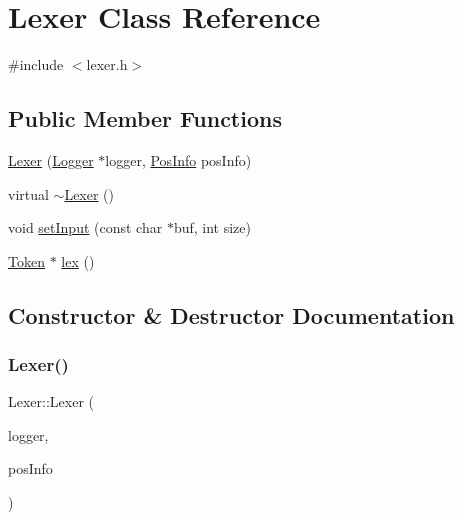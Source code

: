 \hypertarget{classLexer}{}\section{Lexer Class Reference}
\label{classLexer}


{\ttfamily \#include $<$lexer.\+h$>$}

\subsection*{Public Member Functions}
\begin{DoxyCompactItemize}
\item 
\hyperlink{classLexer_a6baa61e0f7eb33bd8a2ca3f95c27ac42}{Lexer} (\hyperlink{classLogger}{Logger} $\ast$logger, \hyperlink{classPosInfo}{Pos\+Info} pos\+Info)
\item 
virtual \hyperlink{classLexer_a30d52b09fc54b92a8ee5bebac1be6cec}{$\sim$\+Lexer} ()
\item 
void \hyperlink{classLexer_aec0b93e8614e2327341c73c2adda68c6}{set\+Input} (const char $\ast$buf, int size)
\item 
\hyperlink{classToken}{Token} $\ast$ \hyperlink{classLexer_ad86200e5fb0cbd86882edf63555ebb08}{lex} ()
\end{DoxyCompactItemize}


\subsection{Constructor \& Destructor Documentation}
\mbox{\label{classLexer_a6baa61e0f7eb33bd8a2ca3f95c27ac42}} 
\subsubsection{\texorpdfstring{Lexer()}{Lexer()}}
{\footnotesize\ttfamily Lexer\+::\+Lexer (\begin{DoxyParamCaption}\item[{\hyperlink{classLogger}{Logger} $\ast$}]{logger,  }\item[{\hyperlink{classPosInfo}{Pos\+Info}}]{pos\+Info }\end{DoxyParamCaption})}

\mbox{\label{classLexer_a30d52b09fc54b92a8ee5bebac1be6cec}} 
